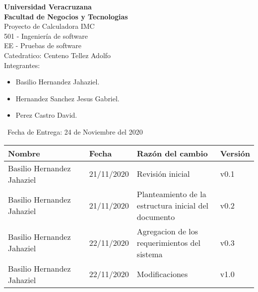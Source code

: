 \documentclass[80pt]{article}
\begin{document}
\begin{titlepage}
	\begin{center}
	{\textbf{Universidad Veracruzana}}\\
	\vspace{0.3cm}  
	{\textbf{{Facultad de Negocios y Tecnologias} }}\\
	\vspace{1cm}	
	{\Large {Proyecto de Calculadora IMC}}\\
	\vspace{1cm}	
	{\Large {501 - Ingeniería de software}}\\
	\vspace{1cm}
	{\Large {EE - Pruebas de software}}\\
	\vspace{1cm}
	{\Large {Catedratico: Centeno Tellez Adolfo}}\\
    \vspace{1cm}
	\textsf{\Large Integrantes: \\}
	\begin{itemize}
		\centering
		\vspace{0.5cm}
    	\item Basilio Hernandez Jahaziel.
    	\centering
    	\vspace{0.5cm}
    	\item Hernandez Sanchez Jesus Gabriel.
    	\centering
    	\vspace{0.5cm}
    	\item Perez Castro David.
	\end{itemize}
	\vspace{1cm}
	\textsf{\ Fecha de Entrega: 24 de Noviembre del 2020 \\}
	\end{center}
\end{titlepage}
\newpage

\vspace{0.5 cm}
\begin{table}[h!]
\centering
\begin{tabular}{|p{0.35\linewidth}|p{0.15\linewidth}|p{0.35\linewidth}|p{0.15\linewidth}|}
\hline
\textbf{Nombre}&\textbf{Fecha}&\textbf{Razón del cambio}&\textbf{Versión}
\\\hline
Basilio Hernandez Jahaziel & 21/11/2020 & Revisión inicial & v0.1 \\\hline
Basilio Hernandez Jahaziel & 21/11/2020 & Planteamiento de la estructura inicial del documento & v0.2 \\\hline
Basilio Hernandez Jahaziel & 22/11/2020 & Agregacion de los requerimientos del sistema & v0.3 \\\hline
Basilio Hernandez Jahaziel & 22/11/2020 & Modificaciones & v1.0 \\\hline
\end{tabular}
\end{table}
\newpage
\end{document}
